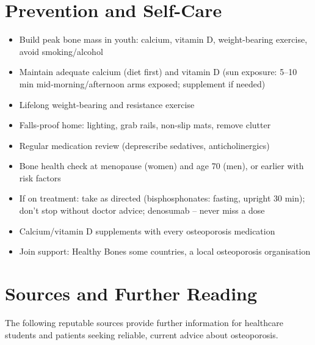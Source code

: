 \section*{Prevention and Self-Care}
\begin{itemize}
    \item Build peak bone mass in youth: calcium, vitamin D, weight-bearing exercise, avoid smoking/alcohol
    \item Maintain adequate calcium (diet first) and vitamin D (sun exposure: 5--10 min mid-morning/afternoon arms exposed; supplement if needed)
    \item Lifelong weight-bearing and resistance exercise
    \item Falls-proof home: lighting, grab rails, non-slip mats, remove clutter
    \item Regular medication review (deprescribe sedatives, anticholinergics)
    \item Bone health check at menopause (women) and age 70 (men), or earlier with risk factors
    \item If on treatment: take as directed (bisphosphonates: fasting, upright 30 min); don't stop without doctor advice; denosumab -- never miss a dose
    \item Calcium/vitamin D supplements with every osteoporosis medication
    \item Join support: Healthy Bones some countries, a local osteoporosis organisation
\end{itemize}

\section*{Sources and Further Reading}
The following reputable sources provide further information for healthcare students and patients seeking reliable, current advice about osteoporosis.

